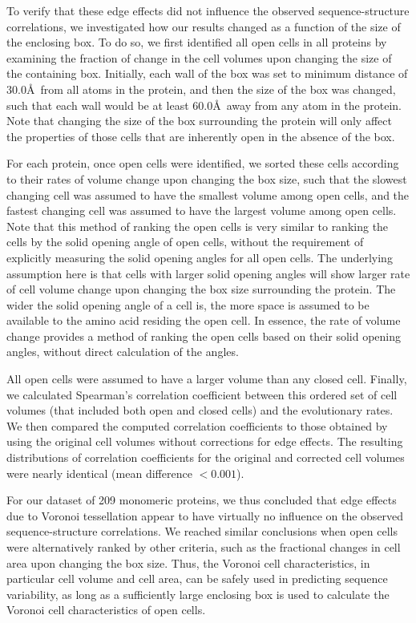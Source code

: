 \documentclass[12pt]{article}
\begin{document}
To verify that these edge effects did not influence the observed sequence-structure correlations, we investigated how our results changed as a function of the size of the enclosing box. To do so, we first identified all open cells in all proteins by examining the fraction of change in the cell volumes upon changing the size of the containing box.  Initially, each wall of the box was set to minimum distance of $30.0$\AA\ from all atoms in the protein, and then the size of the box was changed, such that each wall would be at least $60.0$\AA\ away from any atom in the protein.   Note that changing the size of the box surrounding the protein will only affect the properties of those cells that are inherently open in the absence of the box.

For each protein, once open cells were identified, we sorted these cells according to their rates of volume change upon changing the box size, such that the slowest changing cell was assumed to have the smallest volume among open cells, and the fastest changing cell was assumed to have the largest volume among open cells. Note that this method of ranking the open cells is very similar to ranking the cells by the solid opening angle of open cells, without the requirement of explicitly measuring the solid opening angles for all open cells. The underlying assumption here is that cells with larger solid opening angles will show larger rate of cell volume change upon changing the box size surrounding the protein. The wider the solid opening angle of a cell is, the more space is assumed to be available to the amino acid residing the open cell. In essence, the rate of volume change provides a method of ranking the open cells based on their solid opening angles, without direct calculation of the angles.

All open cells were assumed to have a larger volume than any closed cell.  Finally, we calculated Spearman's correlation coefficient between this ordered set of cell volumes (that included both open and closed cells) and the evolutionary rates. We then compared the computed correlation coefficients to those obtained by using the original cell volumes without corrections for edge effects. The resulting distributions of correlation coefficients for the original and corrected cell volumes were nearly identical (mean difference $<0.001$).

For our dataset of 209 monomeric proteins, we thus concluded that edge effects due to Voronoi tessellation appear to have virtually no influence on the observed sequence-structure correlations. We reached similar conclusions when open cells were alternatively ranked by other criteria, such as the fractional changes in cell area upon changing the box size. Thus, the Voronoi cell characteristics, in particular cell volume and cell area, can be safely used in predicting sequence variability, as long as a sufficiently large enclosing box is used to calculate the Voronoi cell characteristics of open cells.
\end{document}

